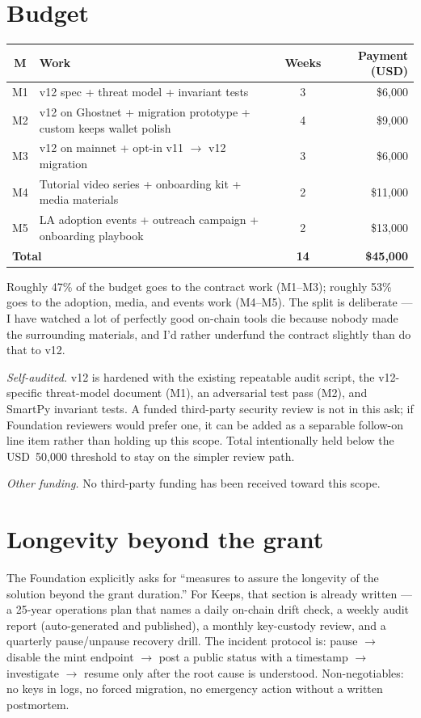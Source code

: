 \documentclass[11pt]{article}
\begin{document}
\section*{Budget}

\begin{tabularx}{\linewidth}{@{}c X c r@{}}
\toprule
\textbf{M} & \textbf{Work} & \textbf{Weeks} & \textbf{Payment (USD)} \\
\midrule
M1 & v12 spec + threat model + invariant tests & 3 & \$6{,}000 \\
M2 & v12 on Ghostnet + migration prototype + custom keeps wallet polish & 4 & \$9{,}000 \\
M3 & v12 on mainnet + opt-in v11 $\rightarrow$ v12 migration & 3 & \$6{,}000 \\
M4 & Tutorial video series + onboarding kit + media materials & 2 & \$11{,}000 \\
M5 & LA adoption events + outreach campaign + onboarding playbook & 2 & \$13{,}000 \\
\midrule
\multicolumn{2}{l}{\textbf{Total}} & \textbf{14} & \textbf{\$45{,}000} \\
\bottomrule
\end{tabularx}

Roughly 47\% of the budget goes to the contract work (M1--M3); roughly 53\% goes to the adoption, media, and events work (M4--M5). The split is deliberate --- I have watched a lot of perfectly good on-chain tools die because nobody made the surrounding materials, and I'd rather underfund the contract slightly than do that to v12.

\textit{Self-audited.} v12 is hardened with the existing repeatable audit script, the v12-specific threat-model document (M1), an adversarial test pass (M2), and SmartPy invariant tests. A funded third-party security review is not in this ask; if Foundation reviewers would prefer one, it can be added as a separable follow-on line item rather than holding up this scope. Total intentionally held below the USD~50{,}000 threshold to stay on the simpler review path.

\textit{Other funding.} No third-party funding has been received toward this scope.

\section*{Longevity beyond the grant}

The Foundation explicitly asks for ``measures to assure the longevity of the solution beyond the grant duration.'' For Keeps, that section is already written --- a 25-year operations plan that names a daily on-chain drift check, a weekly audit report (auto-generated and published), a monthly key-custody review, and a quarterly pause/unpause recovery drill. The incident protocol is: pause $\rightarrow$ disable the mint endpoint $\rightarrow$ post a public status with a timestamp $\rightarrow$ investigate $\rightarrow$ resume only after the root cause is understood. Non-negotiables: no keys in logs, no forced migration, no emergency action without a written postmortem.
\end{document}
